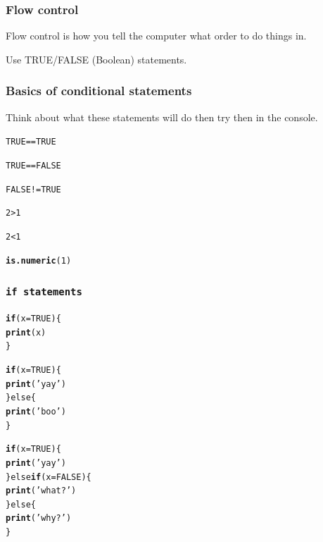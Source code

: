 \documentclass{beamer}\usepackage{graphicx, color}
\makeatletter
\newcommand{\hlfunctioncall}[1]{\textcolor[rgb]{0.501960784313725,0,0.329411764705882}{\textbf{#1}}}%
\newcommand{\hlstring}[1]{\textcolor[rgb]{0.6,0.6,1}{#1}}%
\newenvironment{kframe}{%
 \def\at@end@of@kframe{}%
 \ifinner\ifhmode%
  \def\at@end@of@kframe{\end{minipage}}%
  \begin{minipage}{\columnwidth}%
 \fi\fi%
 \def\FrameCommand##1{\hskip\@totalleftmargin \hskip-\fboxsep
 \colorbox{shadecolor}{##1}\hskip-\fboxsep
     \hskip-\linewidth \hskip-\@totalleftmargin \hskip\columnwidth}%
 \MakeFramed {\advance\hsize-\width
   \@totalleftmargin\z@ \linewidth\hsize
   \@setminipage}}%
 {\par\unskip\endMakeFramed%
 \at@end@of@kframe}
\newenvironment{knitrout}{}{} %
\makeatother
\begin{document}
\begin{frame}
  \frametitle{Flow control}
  Flow control is how you tell the computer what order to do things in.

  Use TRUE/FALSE (Boolean) statements.

\end{frame}

\begin{frame}[fragile]
  \frametitle{Basics of conditional statements}
  Think about what these statements will do then try then in the console.

\begin{knitrout}\small
{}\color{fgcolor}\begin{kframe}
\begin{alltt}
TRUE == TRUE

TRUE == FALSE

FALSE != TRUE

2 > 1

2 < 1

\hlfunctioncall{is.numeric}(1)

\end{alltt}
\end{kframe}
\end{knitrout}


\end{frame}

\begin{frame}[fragile]
  \frametitle{\tt{if} statements}
\begin{knitrout}\small
{}\color{fgcolor}\begin{kframe}
\begin{alltt}
\hlfunctioncall{if}(x = TRUE) \{
  \hlfunctioncall{print}(x)
\}

\hlfunctioncall{if}(x = TRUE) \{
  \hlfunctioncall{print}(\hlstring{'yay'})
\} else \{
  \hlfunctioncall{print}(\hlstring{'boo'})
\}

\hlfunctioncall{if}(x = TRUE) \{
  \hlfunctioncall{print}(\hlstring{'yay'})
\} else \hlfunctioncall{if}(x = FALSE) \{
  \hlfunctioncall{print}(\hlstring{'what?'})
\} else \{
  \hlfunctioncall{print}(\hlstring{'why?'})
\}

\end{alltt}
\end{kframe}
\end{knitrout}


\end{frame}
\end{document}
